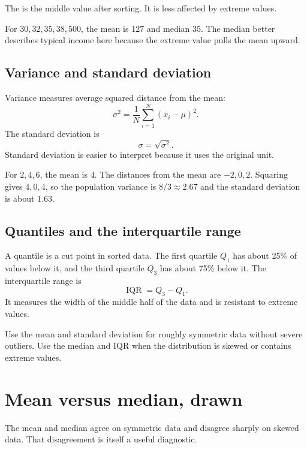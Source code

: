 The  is the middle value after sorting. It is less affected by extreme values.

\begin{workedexample}
For $30,32,35,38,500$, the mean is $127$ and median $35$. The median better describes typical income here because the extreme value pulls the mean upward.
\end{workedexample}

\subsection{Variance and standard deviation}

Variance measures average squared distance from the mean:
\[
  \sigma^2=\frac{1}{N}\sum_{i=1}^{N}(x_i-\mu)^2.
\]
The standard deviation is
\[
  \sigma=\sqrt{\sigma^2}.
\]
Standard deviation is easier to interpret because it uses the original unit.

\begin{workedexample}
For $2,4,6$, the mean is $4$. The distances from the mean are $-2,0,2$. Squaring gives $4,0,4$, so the population variance is $8/3\approx2.67$ and the standard deviation is about $1.63$.
\end{workedexample}

\subsection{Quantiles and the interquartile range}

A quantile is a cut point in sorted data. The first quartile $Q_1$ has about 25\% of values below it, and the third quartile $Q_3$ has about 75\% below it. The interquartile range is
\[
  \operatorname{IQR}=Q_3-Q_1.
\]
It measures the width of the middle half of the data and is resistant to extreme values.

\begin{keyidea}
Use the mean and standard deviation for roughly symmetric data without severe outliers. Use the median and IQR when the distribution is skewed or contains extreme values.
\end{keyidea}

\section{Mean versus median, drawn}

The mean and median agree on symmetric data and disagree sharply on skewed data. That disagreement is itself a useful diagnostic.

